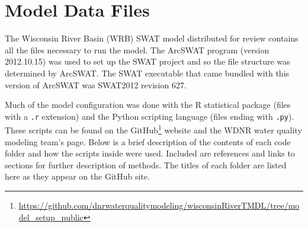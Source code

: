 \section{Model Data Files}
\label{sec:model_data}
The Wisconsin River Basin (WRB) SWAT model distributed for review contains all the files necessary to run the model. The ArcSWAT program (version 2012.10.15) was used to set up the SWAT project and so the file structure was determined by ArcSWAT. The SWAT executable that came bundled with this version of ArcSWAT was SWAT2012 revision 627.

Much of the model configuration was done with the R statistical package (files with a \texttt{.r} extension) and the Python scripting language (files ending with \texttt{.py}). These scripts can be found on the GitHub\footnote{\url{https://github.com/dnrwaterqualitymodeling/wisconsinRiverTMDL/tree/model_setup_public}} website and the WDNR water quality modeling team's page. Below is a brief description of the contents of each code folder and how the scripts inside were used. Included are references and links to sections for further description of methods. The titles of each folder are listed here as they appear on the GitHub site.

